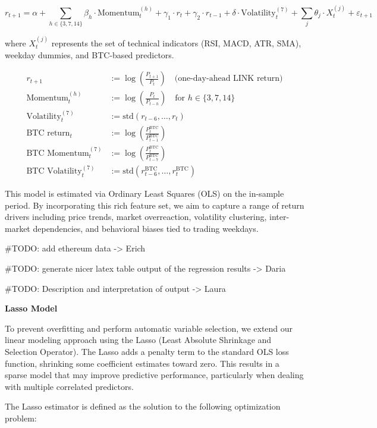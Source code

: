 \documentclass[
  12pt,
]{article}
\begin{document}
\[
r_{t+1} = \alpha + \sum_{h \in \{3,7,14\}} \beta_h \cdot \text{Momentum}_t^{(h)} + \gamma_1 \cdot r_t + \gamma_2 \cdot r_{t-1} + \delta \cdot \text{Volatility}_t^{(7)} + \sum_j \theta_j \cdot X_{t}^{(j)} + \varepsilon_{t+1}
\]

where \(X_t^{(j)}\) represents the set of technical indicators (RSI,
MACD, ATR, SMA), weekday dummies, and BTC-based predictors.

\begin{align*}
r_{t+1} &:= \log\left(\frac{P_{t+1}}{P_t}\right) \quad \text{(one-day-ahead LINK return)} \\
\text{Momentum}_t^{(h)} &:= \log\left(\frac{P_t}{P_{t-h}}\right) \quad \text{for } h \in \{3, 7, 14\} \\
\text{Volatility}_t^{(7)} &:= \text{std} \left( r_{t-6}, \ldots, r_t \right) \\
\text{BTC return}_t &:= \log\left(\frac{P^{\text{BTC}}_t}{P^{\text{BTC}}_{t-1}} \right) \\
\text{BTC Momentum}_t^{(7)} &:= \log\left(\frac{P^{\text{BTC}}_t}{P^{\text{BTC}}_{t-7}}\right) \\
\text{BTC Volatility}_t^{(7)} &:= \text{std} \left( r^{\text{BTC}}_{t-6}, \ldots, r^{\text{BTC}}_t \right)
\end{align*}

This model is estimated via Ordinary Least Squares (OLS) on the
in-sample period. By incorporating this rich feature set, we aim to
capture a range of return drivers including price trends, market
overreaction, volatility clustering, inter-market dependencies, and
behavioral biases tied to trading weekdays.

\#TODO: add ethereum data -\textgreater{} Erich

\#TODO: generate nicer latex table output of the regression results
-\textgreater{} Daria

\#TODO: Description and interpretation of output -\textgreater{} Laura

\textbf{Lasso Model}

To prevent overfitting and perform automatic variable selection, we
extend our linear modeling approach using the Lasso (Least Absolute
Shrinkage and Selection Operator). The Lasso adds a penalty term to the
standard OLS loss function, shrinking some coefficient estimates toward
zero. This results in a sparse model that may improve predictive
performance, particularly when dealing with multiple correlated
predictors.

The Lasso estimator is defined as the solution to the following
optimization problem:
\end{document}
